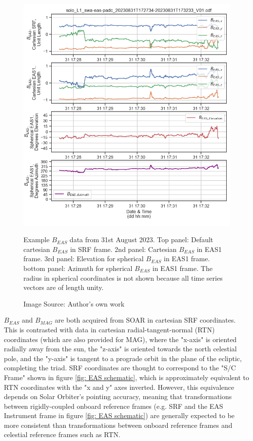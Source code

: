 \begin{figure}[h!]
    \centering
    \centerfloat
    \includegraphics[width=1.05\linewidth]{figures/Transformation Example.png}
    \caption{Example \(B_{EAS}\) data from 31st August 2023. Top panel: Default cartesian \(B_{EAS}\) in SRF frame. 2nd panel: Cartesian \(B_{EAS}\) in EAS1 frame. 3rd panel: Elevation for spherical \(B_{EAS}\) in EAS1 frame. bottom panel: Azimuth for spherical \(B_{EAS}\) in EAS1 frame. The radius in spherical coordinates is not shown because all time series vectors are of length unity.}
    \caption*{Image Source: Author's own work}
    \label{fig: trans example}
\end{figure}

\(B_{EAS}\) and \(B_{MAG}\) are both acquired from SOAR in cartesian SRF coordinates. This is contrasted with data in cartesian radial-tangent-normal (RTN) coordinates (which are also provided for MAG\cite{soar}), where the "x-axis" is oriented radially away from the sun, the "z-axis" is oriented towards the north celestial pole, and the "y-axis" is tangent to a prograde orbit in the plane of the ecliptic, completing the triad. SRF coordinates are thought to correspond to the "S/C Frame" shown in figure \ref{fig: EAS schematic}, which is approximately equivalent to RTN coordinates with the "x and y" axes inverted. However, this equivalence depends on Solar Orbiter's pointing accuracy, meaning that transformations between rigidly-coupled onboard reference frames (e.g. SRF and the EAS Instrument frame in figure \ref{fig: EAS schematic}) are generally expected to be more consistent than transformations between onboard reference frames and celestial reference frames such as RTN\cite{erofeev2019}.
\\

